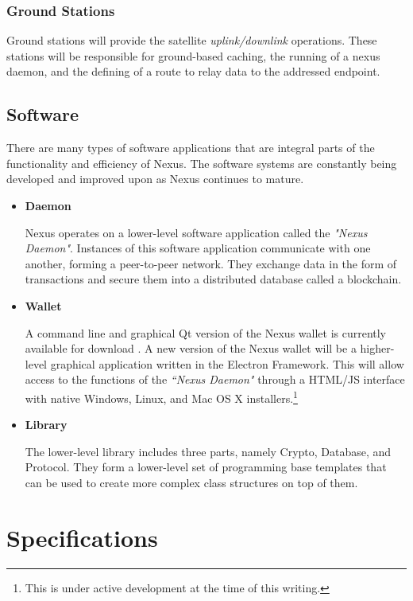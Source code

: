 \documentclass[11pt]{article}
\begin{document}
\subsubsection{Ground Stations}

Ground stations will provide the satellite \textit{uplink/downlink} operations. 
These stations will be responsible for ground-based caching, the running of a nexus daemon, and the defining of a route to relay data to the addressed endpoint.

\subsection{Software}

There are many types of software applications that are integral parts of the functionality and efficiency of Nexus. The software systems are constantly being developed and improved upon as Nexus continues to mature.

\begin{itemize}
\item \textbf{Daemon}

Nexus operates on a lower-level software application called the \textit{"Nexus Daemon"}.
Instances of this software application communicate with one another, forming a peer-to-peer network.
They exchange data in the form of transactions and secure them into a distributed database called a blockchain.

\item \textbf{Wallet}

A command line and graphical Qt version of the Nexus wallet is currently available for download \cite{githubnexusreleases} \cite{nexusearth}.
A new version of the Nexus wallet will be a higher-level graphical application written in the Electron Framework.
This will allow access to the functions of the \textit{``Nexus Daemon"} through a HTML/JS interface with native Windows, Linux, and Mac OS X installers.\footnote{This is under active development at the time of this writing.}

\item \textbf{Library}

The lower-level library includes three parts, namely Crypto, Database, and Protocol. 
They form a lower-level set of programming base templates that can be used to create more complex class structures on top of them. 

\end{itemize}

\section{Specifications}
\end{document}
